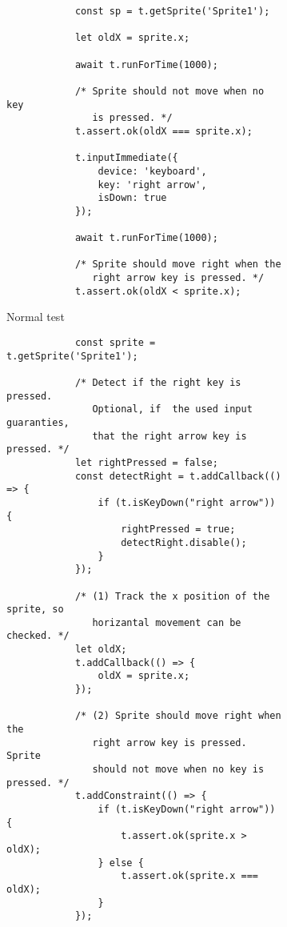 \begin{figure}[h]
    \centering
    \begin{subfigure}[b]{.43\textwidth}
        \centering
        \begin{verbatim}
            const sp = t.getSprite('Sprite1');

            let oldX = sprite.x;

            await t.runForTime(1000);

            /* Sprite should not move when no key
               is pressed. */
            t.assert.ok(oldX === sprite.x);

            t.inputImmediate({
                device: 'keyboard',
                key: 'right arrow',
                isDown: true
            });

            await t.runForTime(1000);

            /* Sprite should move right when the
               right arrow key is pressed. */
            t.assert.ok(oldX < sprite.x);
        \end{verbatim}
        \caption{Normal test}
    \end{subfigure}
    \hspace{.08\textwidth}
    \begin{subfigure}[b]{.47\textwidth}
        \centering
        \begin{verbatim}
            const sprite = t.getSprite('Sprite1');

            /* Detect if the right key is pressed.
               Optional, if  the used input guaranties,
               that the right arrow key is pressed. */
            let rightPressed = false;
            const detectRight = t.addCallback(() => {
                if (t.isKeyDown("right arrow")) {
                    rightPressed = true;
                    detectRight.disable();
                }
            });

            /* (1) Track the x position of the sprite, so
               horizantal movement can be checked. */
            let oldX;
            t.addCallback(() => {
                oldX = sprite.x;
            });

            /* (2) Sprite should move right when the
               right arrow key is pressed. Sprite
               should not move when no key is pressed. */
            t.addConstraint(() => {
                if (t.isKeyDown("right arrow")) {
                    t.assert.ok(sprite.x > oldX);
                } else {
                    t.assert.ok(sprite.x === oldX);
                }
            });


\end{verbatim}
\end{subfigure}
\end{figure}
